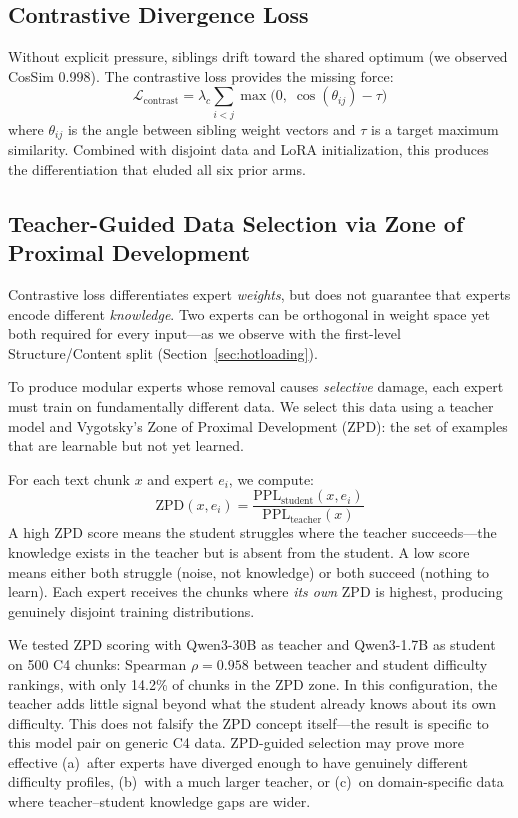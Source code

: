 \documentclass{article}
\begin{document}
\subsection{Contrastive Divergence Loss}
\label{sec:contrastive}

Without explicit pressure, siblings drift toward the shared optimum (we observed
CosSim 0.998). The contrastive loss provides the missing force:
\begin{equation}
\mathcal{L}_{\text{contrast}} = \lambda_c \sum_{i < j} \max\bigl(0,\; \cos(\theta_{ij}) - \tau\bigr)
\label{eq:contrastive}
\end{equation}
where $\theta_{ij}$ is the angle between sibling weight vectors and $\tau$ is a
target maximum similarity. Combined with disjoint data and LoRA initialization,
this produces the differentiation that eluded all six prior arms.

\subsection{Teacher-Guided Data Selection via Zone of Proximal Development}
\label{sec:zpd}

Contrastive loss differentiates expert \emph{weights}, but does not guarantee
that experts encode different \emph{knowledge}. Two experts can be orthogonal
in weight space yet both required for every input---as we observe with the
first-level Structure/Content split (Section~\ref{sec:hotloading}).

To produce modular experts whose removal causes \emph{selective} damage, each
expert must train on fundamentally different data. We select this data using a
teacher model and Vygotsky's Zone of Proximal Development (ZPD): the set of
examples that are learnable but not yet learned.

For each text chunk $x$ and expert $e_i$, we compute:
\begin{equation}
\text{ZPD}(x, e_i) = \frac{\text{PPL}_{\text{student}}(x, e_i)}{\text{PPL}_{\text{teacher}}(x)}
\label{eq:zpd}
\end{equation}
A high ZPD score means the student struggles where the teacher succeeds---the
knowledge exists in the teacher but is absent from the student. A low score
means either both struggle (noise, not knowledge) or both succeed (nothing to
learn). Each expert receives the chunks where \emph{its own} ZPD is highest,
producing genuinely disjoint training distributions.

We tested ZPD scoring with Qwen3-30B as teacher and Qwen3-1.7B as student on
500 C4 chunks: Spearman $\rho = 0.958$ between teacher and student difficulty
rankings, with only 14.2\% of chunks in the ZPD zone. In this configuration,
the teacher adds little signal beyond what the student already knows about its
own difficulty. This does not falsify the ZPD concept itself---the result is
specific to this model pair on generic C4 data. ZPD-guided selection may prove
more effective (a)~after experts have diverged enough to have genuinely
different difficulty profiles, (b)~with a much larger teacher, or (c)~on
domain-specific data where teacher--student knowledge gaps are wider.
\end{document}

